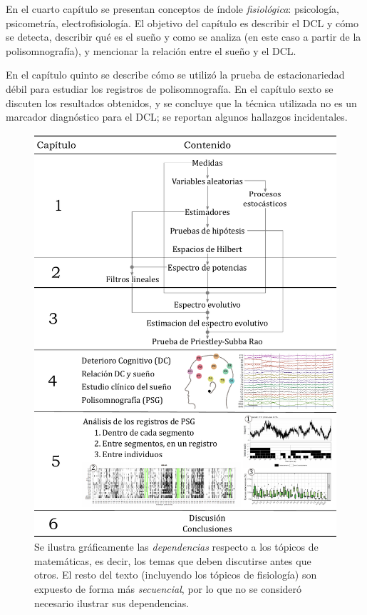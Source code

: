 \documentclass[12pt,letterpaper]{book}
\begin{document}
En el cuarto capítulo se presentan conceptos de índole \textit{fisiológica}: psicología, psicometría, electrofisiología.
%
El objetivo del capítulo es describir el DCL y cómo se detecta, describir qué es el sueño y como se analiza (en este caso a partir de la polisomnografía), y mencionar la relación entre el sueño y el DCL.

En el capítulo quinto se describe cómo se utilizó la prueba de estacionariedad débil para estudiar los registros de polisomnografía.
%
En el capítulo sexto se discuten los resultados obtenidos, y se concluye que la técnica utilizada no es un marcador diagnóstico para el DCL; se reportan algunos hallazgos incidentales.

\begin{figure}
\centering
\includegraphics[width=.9\textwidth]{./estructura_texto_v2.pdf}
\caption[Estructura de la tesis]{Se ilustra gráficamente las \textit{dependencias} respecto a los tópicos de matemáticas, es decir, los temas que deben discutirse antes que otros. El resto del texto (incluyendo los tópicos de fisiología) son expuesto de forma más \textit{secuencial}, por lo que no se consideró necesario ilustrar sus dependencias.}
\label{intro:estructura}
\end{figure}
\end{document}
